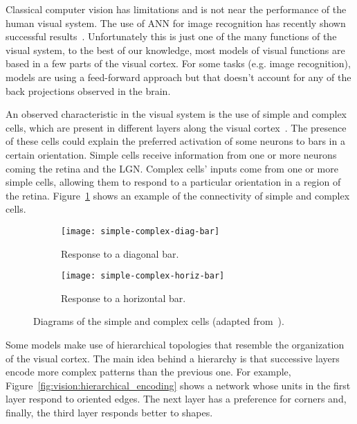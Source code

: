 Classical computer vision has limitations and is not near the performance of the human visual system. The use of ANN for image recognition has recently shown successful results~\cite{krizhevsky2012imagenet}. Unfortunately this is just one of the many functions of the visual system, to the best of our knowledge, most models of visual functions are based in a few parts of the visual cortex. For some tasks (e.g. image recognition), models are using a feed-forward approach but that doesn't account for any of the back projections observed in the brain.

An observed characteristic in the visual system is the use of simple and complex cells, which are present in different layers along the visual cortex~\cite{hubel1962receptive,thompson2000brain}. The presence of these cells could explain the preferred activation of some neurons to bars in a certain orientation. Simple cells receive information from one or more neurons coming the retina and the LGN. Complex cells' inputs come from one or more simple cells, allowing them to respond to a particular orientation in a region of the retina. Figure~\ref{fig:vision:simple-complex} shows an example of the connectivity of simple and complex cells.

\begin{figure}[h]
  \begin{center}
    \begin{subfigure}[t]{0.4\textwidth}
      \texttt{[image: simple-complex-diag-bar]}
      \caption{Response to a diagonal bar.}
    \end{subfigure}
    \begin{subfigure}[t]{0.4\textwidth}
      \texttt{[image: simple-complex-horiz-bar]}
      \caption{Response to a horizontal bar.}
    \end{subfigure}
    \caption{Diagrams of the simple and complex cells (adapted from~\cite{wikipedia-images}). }
    \label{fig:vision:simple-complex}
  \end{center}
\end{figure}

Some models make use of hierarchical topologies that resemble the organization of the visual cortex. The main idea behind a hierarchy is that successive layers encode more complex patterns than the previous one. For example, Figure~\ref{fig:vision:hierarchical_encoding} shows a network whose units in the first layer respond to oriented edges. The next layer has a preference for corners and, finally, the third layer responds better to shapes.

